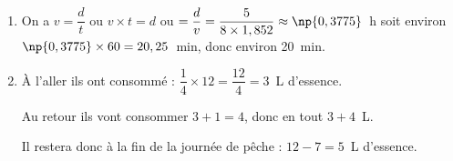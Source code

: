 
\medskip

%
%
%
%
%
%
%
%
%
%
%
%

\begin{enumerate}
\item %

On a $v = \dfrac{d}{t}$ ou $v\times t = d$ ou $ = \dfrac{d}{v} = \dfrac{5}{8 \times 1,852} \approx \np{0,3775}$~h soit environ $\np{0,3775} \times 60 = 20,25$~min, donc environ 20~min.
\item %
À l'aller ils ont consommé : $\dfrac{1}{4} \times 12 = \dfrac{12}{4} = 3$~L d'essence.

Au retour ils vont consommer $3 + 1 = 4$, donc en tout $3 + 4$~L.

Il restera donc à la fin de la journée de pêche : $12 - 7 = 5$~L d'essence.
\end{enumerate}

\vspace{0,5cm}

